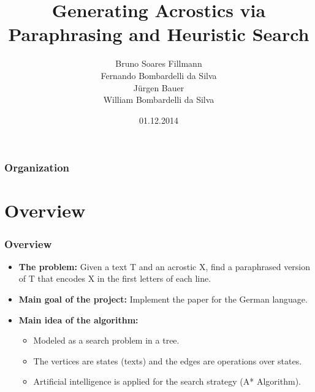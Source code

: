 \documentclass{beamer}
\title[Generating Acrostics via Paraphrasing and Heuristic Search]{Generating Acrostics via Paraphrasing and Heuristic Search} %
\author[Bruno, Fernando, Jürgen, William]{Bruno Soares Fillmann\\
Fernando Bombardelli da Silva\\
Jürgen Bauer\\
William Bombardelli da Silva
} %
\institute[TU Berlin] %
{
Technische Universität Berlin \\ %
Datenbanksysteme und Informationsmanagement \\
DBPRO – Database Projects (WS 2014/2015) \\
\medskip
}
\date{01.12.2014} %
\begin{document}
\begin{frame}
\titlepage %
\end{frame}

\begin{frame}
\frametitle{Organization} %
\tableofcontents %
\end{frame}


\section{Overview} %


\begin{frame}
\frametitle{Overview}
\begin{itemize}
\item \textbf{The problem:} Given a text T and an acrostic X, find a paraphrased version of T that encodes X in the first letters of each line.
\item \textbf{Main goal of the project:} Implement the paper for the German language.
\item \textbf{Main idea of the algorithm:}
	\begin{itemize}
	\item Modeled as a search problem in a tree.
	\item The vertices are states (texts) and the edges are operations over states.
	\item Artificial intelligence is applied for the search strategy (A* Algorithm).
	\end{itemize}
\end{itemize}
\end{frame}
\end{document}
